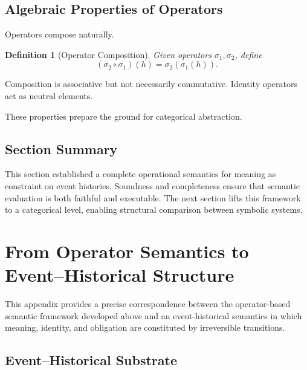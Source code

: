 \documentclass[11pt]{article}
\newtheorem{definition}{Definition}
\begin{document}
\subsection{Algebraic Properties of Operators}

Operators compose naturally.

\begin{definition}[Operator Composition]
Given operators $\sigma_1, \sigma_2$, define
\[
(\sigma_2 \circ \sigma_1)(h) = \sigma_2(\sigma_1(h)).
\]
\end{definition}

Composition is associative but not necessarily commutative. Identity operators
act as neutral elements.

These properties prepare the ground for categorical abstraction.

\subsection{Section Summary}

This section established a complete operational semantics for meaning as
constraint on event histories. Soundness and completeness ensure that semantic
evaluation is both faithful and executable. The next section lifts this framework
to a categorical level, enabling structural comparison between symbolic systems.

\section{From Operator Semantics to Event--Historical Structure}

This appendix provides a precise correspondence between the operator-based
semantic framework developed above and an event-historical semantics in which
meaning, identity, and obligation are constituted by irreversible transitions.

\subsection{Event--Historical Substrate}
\end{document}
